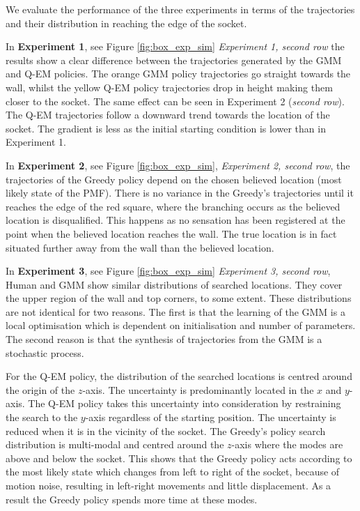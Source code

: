 \documentclass[final,3p,times,twocolumn]{elsarticle}
\begin{document}
We evaluate the performance of the three experiments in terms of the trajectories and their distribution in reaching 
the edge of the socket. 

In \textbf{Experiment 1}, see Figure \ref{fig:box_exp_sim} \textit{Experiment 1, second row} the results show 
a clear difference between the trajectories generated by the GMM and Q-EM policies. The orange GMM policy trajectories 
go straight towards the wall, whilst the yellow Q-EM policy trajectories drop in height making them closer 
to the socket. The same effect can be seen in Experiment 2 (\textit{second row}). The Q-EM trajectories 
follow a downward trend towards the location of the socket. The gradient is less as the initial starting condition is 
lower than in Experiment 1. 

In \textbf{Experiment 2}, see Figure \ref{fig:box_exp_sim}, \textit{Experiment 2, second row}, 
the trajectories of the Greedy policy depend on the chosen believed location (most likely state of the PMF). There 
is no variance in the Greedy's trajectories until it reaches the edge of the red square, where the branching 
occurs as the believed location is disqualified. This happens as no sensation has been registered at the point 
when the believed location reaches the wall. The true location is in fact situated further away from the wall 
than the believed location.

In \textbf{Experiment 3}, see Figure \ref{fig:box_exp_sim} \textit{Experiment 3, second row}, Human and GMM show 
similar distributions of searched locations. They cover the upper region of the wall and top corners, to 
some extent. These distributions are not identical for two reasons. The first is that the learning of the GMM is a 
local optimisation which is dependent on initialisation and number of parameters. The second reason is that 
the synthesis of trajectories from the GMM is a stochastic process. 

For the  Q-EM policy, the distribution of the searched locations is centred around the origin of the $z$-axis.
The uncertainty is predominantly located in the $x$ and $y$-axis. The Q-EM policy takes this uncertainty 
into consideration by restraining the search to the $y$-axis regardless of the starting position. The uncertainty 
is reduced when it is in the vicinity of the socket. 
The Greedy's policy search distribution is multi-modal and centred around the $z$-axis where the modes are above 
and below the socket. This shows that the Greedy policy acts according to the most likely state 
which changes from left to right of the socket, because of motion noise, resulting in left-right 
movements and little displacement. As a result the Greedy policy spends more time at these modes.
\end{document}
